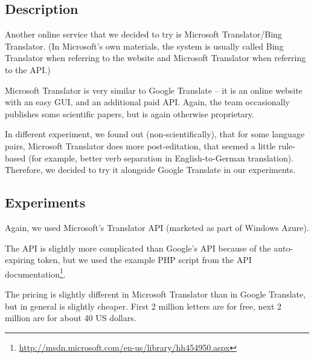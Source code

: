 \subsection{Description}
Another online service that we decided to try is Microsoft Translator/Bing Translator. (In Microsoft's own materials, the system is usually called Bing Translator when referring to the website and Microsoft Translator when referring to the API.)

Microsoft Translator is very similar to Google Translate -- it is an online website with an easy GUI, and an additional paid API. Again, the team occasionally publishes some scientific papers, but is again otherwise proprietary.

In different experiment, we found out (non-scientifically), that for some language pairs, Microsoft Translator does more post-editation, that seemed a little rule-based (for example, better verb separation in English-to-German translation). Therefore, we decided to try it alongside Google Translate in our experiments.


\subsection{Experiments}
Again, we used Microsoft's Translator API (marketed as part of Windows Azure).

The API is slightly more complicated than Google's API because of the auto-expiring token, but we used the example PHP script from the API documentation\footnote{\url{http://msdn.microsoft.com/en-us/library/hh454950.aspx}}.

The pricing is slightly different in Microsoft Translator than in Google Translate, but in general is slightly cheaper. First 2 million letters are for free, next 2 million are for about 40 US dollars.
